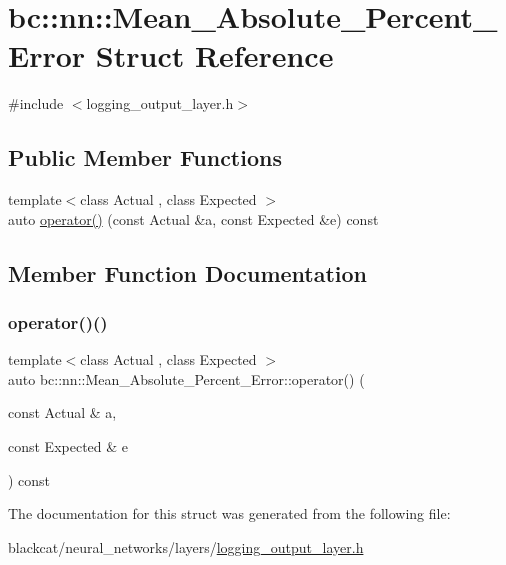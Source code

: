 \hypertarget{structbc_1_1nn_1_1Mean__Absolute__Percent__Error}{}\section{bc\+:\+:nn\+:\+:Mean\+\_\+\+Absolute\+\_\+\+Percent\+\_\+\+Error Struct Reference}
\label{structbc_1_1nn_1_1Mean__Absolute__Percent__Error}


{\ttfamily \#include $<$logging\+\_\+output\+\_\+layer.\+h$>$}

\subsection*{Public Member Functions}
\begin{DoxyCompactItemize}
\item 
{\footnotesize template$<$class Actual , class Expected $>$ }\\auto \hyperlink{structbc_1_1nn_1_1Mean__Absolute__Percent__Error_adae95a7167570086dff20d80bd7c5053}{operator()} (const Actual \&a, const Expected \&e) const
\end{DoxyCompactItemize}


\subsection{Member Function Documentation}
\mbox{\label{structbc_1_1nn_1_1Mean__Absolute__Percent__Error_adae95a7167570086dff20d80bd7c5053}} 
\subsubsection{\texorpdfstring{operator()()}{operator()()}}
{\footnotesize\ttfamily template$<$class Actual , class Expected $>$ \\
auto bc\+::nn\+::\+Mean\+\_\+\+Absolute\+\_\+\+Percent\+\_\+\+Error\+::operator() (\begin{DoxyParamCaption}\item[{const Actual \&}]{a,  }\item[{const Expected \&}]{e }\end{DoxyParamCaption}) const\hspace{0.3cm}{\ttfamily [inline]}}



The documentation for this struct was generated from the following file\+:\begin{DoxyCompactItemize}
\item 
blackcat/neural\+\_\+networks/layers/\hyperlink{logging__output__layer_8h}{logging\+\_\+output\+\_\+layer.\+h}\end{DoxyCompactItemize}
